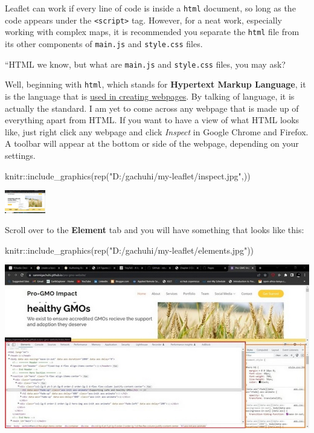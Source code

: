\documentclass[
]{book}
\newenvironment{Shaded}{\begin{snugshade}}{\end{snugshade}}
\newcommand{\FunctionTok}[1]{\textcolor[rgb]{0.00,0.00,0.00}{#1}}
\newcommand{\NormalTok}[1]{#1}
\newcommand{\SpecialCharTok}[1]{\textcolor[rgb]{0.00,0.00,0.00}{#1}}
\newcommand{\StringTok}[1]{\textcolor[rgb]{0.31,0.60,0.02}{#1}}
\theoremstyle{definition}
\theoremstyle{definition}
\theoremstyle{definition}
\theoremstyle{definition}
\theoremstyle{remark}
\begin{document}
Leaflet can work if every line of code is inside a \texttt{html} document, so long as the code appears under the \texttt{\textless{}script\textgreater{}} tag. However, for a neat work, especially working with complex maps, it is recommended you separate the \texttt{html} file from its other components of \texttt{main.js} and \texttt{style.css} files.

``HTML we know, but what are \texttt{main.js} and \texttt{style.css} files, you may ask?

Well, beginning with \texttt{html}, which stands for \textbf{Hypertext Markup Language}, it is the language that is \href{https://www.tutorialspoint.com/html/index.htm}{used in creating webpages}. By talking of language, it is actually the standard. I am yet to come across any webpage that is made up of everything apart from HTML. If you want to have a view of what HTML looks like, just right click any webpage and click \emph{Inspect} in Google Chrome and Firefox. A toolbar will appear at the bottom or side of the webpage, depending on your settings.

\begin{Shaded}
\begin{Highlighting}[]
\NormalTok{knitr}\SpecialCharTok{::}\FunctionTok{include\_graphics}\NormalTok{(}\FunctionTok{rep}\NormalTok{(}\StringTok{"D:/gachuhi/my{-}leaflet/inspect.jpg"}\NormalTok{,))}
\end{Highlighting}
\end{Shaded}

\includegraphics[width=50pt]{../inspect}

Scroll over to the \textbf{Element} tab and you will have something that looks like this:

\begin{Shaded}
\begin{Highlighting}[]
\NormalTok{knitr}\SpecialCharTok{::}\FunctionTok{include\_graphics}\NormalTok{(}\FunctionTok{rep}\NormalTok{(}\StringTok{"D:/gachuhi/my{-}leaflet/elements.jpg"}\NormalTok{))}
\end{Highlighting}
\end{Shaded}

\includegraphics[width=26.67in]{../elements}
\end{document}
